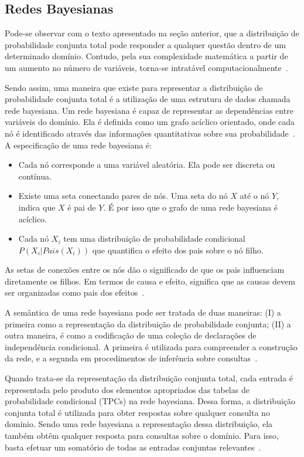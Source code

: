 \subsection{Redes Bayesianas}
\label{sec:redes-bayesianas}
Pode-se observar com o texto apresentado na seção anterior, que a distribuição de probabilidade conjunta total pode responder a qualquer questão dentro de um determinado domínio. Contudo, pela sua complexidade matemática a partir de um aumento no número de variáveis, torna-se intratável computacionalmente~\cite{russell:2002}.

Sendo assim, uma maneira que existe para representar a distribuição de probabilidade conjunta total é a utilização de uma estrutura de dados chamada rede bayesiana. Um rede bayesiana é capaz de representar as dependências entre variáveis do domínio. Ela é definida como um grafo acíclico orientado, onde cada nó é identificado através das informações quantitativas sobre sua probabilidade~\cite{russell:2002}. A especificação de uma rede bayesiana é:

\begin{itemize}
    \item Cada nó corresponde a uma variável aleatória. Ela pode ser discreta ou contínua.
    \item Existe uma seta conectando pares de nós. Uma seta do nó $X$ até o nó $Y$, indica que $X$ é pai de $Y$. É por isso que o grafo de uma rede bayesiana é acíclico.
    \item Cada nó $X_i$ tem uma distribuição de probabilidade condicional $P(X_i|Pais(X_i))$ que quantifica o efeito dos pais sobre o nó filho.
\end{itemize}

As setas de conexões entre os nós dão o significado de que os pais influenciam diretamente os filhos. Em termos de causa e efeito, significa que as causas devem ser organizadas como pais dos efeitos~\cite{russell:2002}.

A semântica de uma rede bayesiana pode ser tratada de duas maneiras: (I) a primeira como a representação da distribuição de probabilidade conjunta; (II) a outra maneira, é como a codificação de uma coleção de declarações de independência condicional. A primeira é utilizada para compreender a construção da rede, e a segunda em procedimentos de inferência sobre consultas~\cite{russell:2002}.

Quando trata-se da representação da distribuição conjunta total, cada entrada é representada pelo produto dos elementos apropriados das tabelas de probabilidade condicional (TPCs) na rede bayesiana. Dessa forma, a distribuição conjunta total é utilizada para obter respostas sobre qualquer consulta no domínio. Sendo uma rede bayesiana a representação dessa distribuição, ela também obtêm qualquer resposta para consultas sobre o domínio. Para isso, basta efetuar um somatório de todas as entradas conjuntas relevantes~\cite{russell:2002}.

